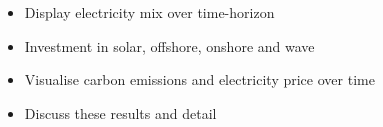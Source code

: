 \documentclass{article}
\begin{document}
\begin{itemize}
	\item Display electricity mix over time-horizon
	\item Investment in solar, offshore, onshore and wave
	\item Visualise carbon emissions and electricity price over time
	\item Discuss these results and detail 
\end{itemize}





\end{document}
